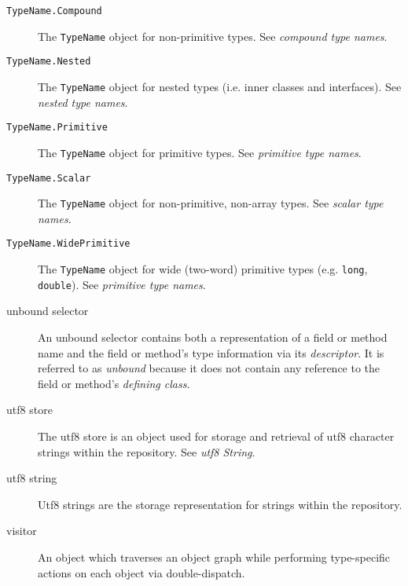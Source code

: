 \documentclass{report}
\begin{document}
\begin{description}
	\item[\texttt{TypeName.Compound}] The \texttt{TypeName} object for
	non-primitive types. See {\em compound type names}.

	\item[\texttt{TypeName.Nested}] The \texttt{TypeName} object for
	nested types (i.e. inner classes and interfaces). See {\em nested 
	type names}.

	\item[\texttt{TypeName.Primitive}] The \texttt{TypeName} object for
	primitive types. See {\em primitive type names}.

	\item[\texttt{TypeName.Scalar}] The \texttt{TypeName} object for 
	non-primitive, non-array types. See {\em scalar type names}.

	\item[\texttt{TypeName.WidePrimitive}] The \texttt{TypeName} object
	for wide (two-word) primitive types (e.g. \texttt{long}, 
	\texttt{double}). See {\em primitive type names}.

	\item[unbound selector] An unbound selector contains both a 
	representation of a field or method name and the field or method's
	type information via its {\em descriptor}. It is referred to
	as {\em unbound} because it does not contain any reference to
	the field or method's {\em defining class}.

	\item[utf8 store] The utf8 store is an object used for storage and 
	retrieval of utf8 character strings within the repository. See
	{\em utf8 String}.

	\item[utf8 string] Utf8 strings are the storage representation for 
	strings within the repository.

	\item[visitor] An object which traverses an object graph while 
	performing type-specific actions on each object via double-dispatch.

\end{description}

{\small


}
\end{document}

